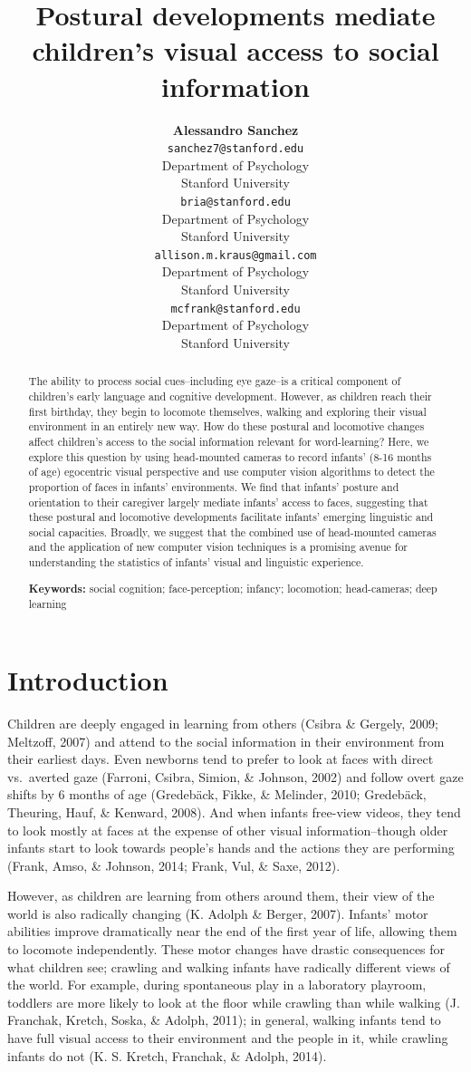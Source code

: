\documentclass[10pt, letterpaper]{article}
\title{Postural developments mediate children's visual access to social
information}
\author{{\large \bf Alessandro Sanchez} \\ \texttt{sanchez7@stanford.edu} \\ Department of Psychology \\ Stanford University \And {\large \bf Bria Long} \\ \texttt{bria@stanford.edu} \\ Department of Psychology \\ Stanford University \And {\large \bf Ally Kraus} \\ \texttt{allison.m.kraus@gmail.com} \\ Department of Psychology \\ Stanford University \And {\large \bf Michael C. Frank} \\ \texttt{mcfrank@stanford.edu} \\ Department of Psychology \\ Stanford University}
\begin{document}
\maketitle

\begin{abstract}
The ability to process social cues--including eye gaze--is a critical
component of children's early language and cognitive development.
However, as children reach their first birthday, they begin to locomote
themselves, walking and exploring their visual environment in an
entirely new way. How do these postural and locomotive changes affect
children's access to the social information relevant for word-learning?
Here, we explore this question by using head-mounted cameras to record
infants' (8-16 months of age) egocentric visual perspective and use
computer vision algorithms to detect the proportion of faces in infants'
environments. We find that infants' posture and orientation to their
caregiver largely mediate infants' access to faces, suggesting that
these postural and locomotive developments facilitate infants' emerging
linguistic and social capacities. Broadly, we suggest that the combined
use of head-mounted cameras and the application of new computer vision
techniques is a promising avenue for understanding the statistics of
infants' visual and linguistic experience.

\textbf{Keywords:}
social cognition; face-perception; infancy; locomotion; head-cameras;
deep learning
\end{abstract}

\section{Introduction}\label{introduction}

Children are deeply engaged in learning from others (Csibra \& Gergely,
2009; Meltzoff, 2007) and attend to the social information in their
environment from their earliest days. Even newborns tend to prefer to
look at faces with direct vs.~averted gaze (Farroni, Csibra, Simion, \&
Johnson, 2002) and follow overt gaze shifts by 6 months of age
(Gredebäck, Fikke, \& Melinder, 2010; Gredebäck, Theuring, Hauf, \&
Kenward, 2008). And when infants free-view videos, they tend to look
mostly at faces at the expense of other visual information--though older
infants start to look towards people's hands and the actions they are
performing (Frank, Amso, \& Johnson, 2014; Frank, Vul, \& Saxe, 2012).

However, as children are learning from others around them, their view of
the world is also radically changing (K. Adolph \& Berger, 2007).
Infants' motor abilities improve dramatically near the end of the first
year of life, allowing them to locomote independently. These motor
changes have drastic consequences for what children see; crawling and
walking infants have radically different views of the world. For
example, during spontaneous play in a laboratory playroom, toddlers are
more likely to look at the floor while crawling than while walking (J.
Franchak, Kretch, Soska, \& Adolph, 2011); in general, walking infants
tend to have full visual access to their environment and the people in
it, while crawling infants do not (K. S. Kretch, Franchak, \& Adolph,
2014).
\end{document}
